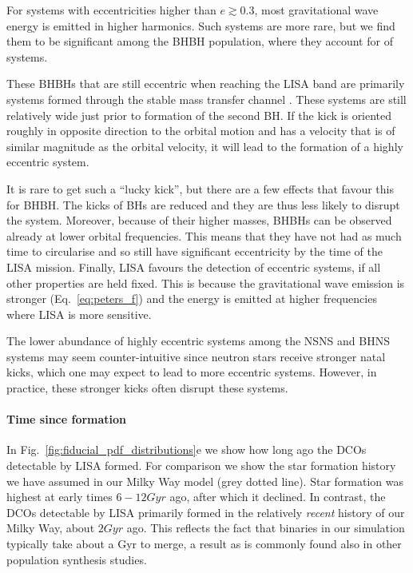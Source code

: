 For systems with eccentricities higher than $e\gtrsim0.3$, most gravitational wave energy is emitted in higher harmonics. Such systems are more rare, but we find them to be significant among the BHBH population, where they account for \BHBHHighlyEccentric{} of systems.

These BHBHs that are still eccentric when reaching the LISA band are primarily systems formed through the stable mass transfer channel \citep{vandenHeuvel+2017}. These systems are still relatively wide just prior to formation of the second BH. If the kick is oriented roughly in opposite direction to the orbital motion and has a velocity that is of similar magnitude as the orbital velocity, it will lead to the formation of a highly eccentric system. 

It is rare to get such a ``lucky kick'', but there are a few effects that favour this for BHBH. The kicks of BHs are reduced and they are thus less likely to disrupt the system.  Moreover, because of their higher masses, BHBHs can be observed already at lower orbital frequencies. This means that they have not had as much time to circularise and so still have significant eccentricity by the time of the LISA mission. Finally, LISA favours the detection of eccentric systems, if all other properties are held fixed. This is because the gravitational wave emission is stronger (Eq.~\ref{eq:peters_f}) and the energy is emitted at higher frequencies \citep[Eq.~20]{Peters+1963} where LISA is more sensitive.

The lower abundance of highly eccentric systems among the NSNS and BHNS systems may seem counter-intuitive since neutron stars receive stronger natal kicks, which one may expect to lead to more eccentric systems.  However, in practice, these stronger kicks often disrupt these systems. 

\paragraph{Time since formation} 
In Fig.~\ref{fig:fiducial_pdf_distributions}e we show how long ago the DCOs detectable by LISA formed. For comparison we show the star formation history we have assumed in our Milky Way model (grey dotted line). Star formation was highest at early times $6-12\unit{Gyr}$ ago, after which it declined.  In contrast, the DCOs detectable by LISA primarily formed in the relatively \textit{recent} history of our Milky Way, about $2 \unit{Gyr}$ ago. This reflects the fact that binaries in our simulation typically take about a Gyr to merge, a result as is commonly found also in other population synthesis studies.

